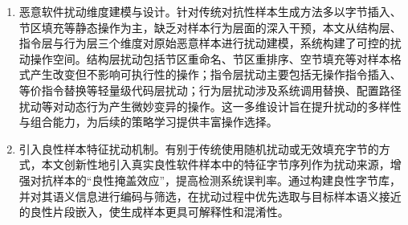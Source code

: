 \begin{enumerate} [label=\arabic*)] 
\item 恶意软件扰动维度建模与设计。针对传统对抗性样本生成方法多以字节插入、节区填充等静态操作为主，缺乏对样本行为层面的深入干预，本文从结构层、指令层与行为层三个维度对原始恶意样本进行扰动建模，系统构建了可控的扰动操作空间。结构层扰动包括节区重命名、节区重排序、空节填充等对样本格式产生改变但不影响可执行性的操作；指令层扰动主要包括无操作指令插入、等价指令替换等轻量级代码层扰动；行为层扰动涉及系统调用替换、配置路径扰动等对动态行为产生微妙变异的操作。这一多维设计旨在提升扰动的多样性与组合能力，为后续的策略学习提供丰富操作选择。

\item 引入良性样本特征扰动机制。有别于传统使用随机扰动或无效填充字节的方式，本文创新性地引入真实良性软件样本中的特征字节序列作为扰动来源，增强对抗样本的“良性掩盖效应”，提高检测系统误判率。通过构建良性字节库，并对其语义信息进行编码与筛选，在扰动过程中优先选取与目标样本语义接近的良性片段嵌入，使生成样本更具可解释性和混淆性。


\end{enumerate}
